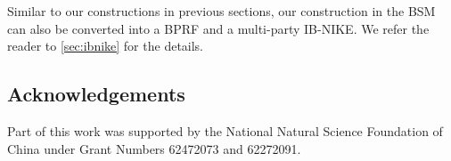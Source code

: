 %

 Similar to our constructions in previous sections, our construction in the BSM can also be converted into a BPRF and a multi-party IB-NIKE. We refer the reader to \cref{sec:ibnike} for the details.





\subsection*{\bf Acknowledgements}
Part of this work was supported by the National Natural Science Foundation of China under Grant Numbers 62472073 and 62272091.
